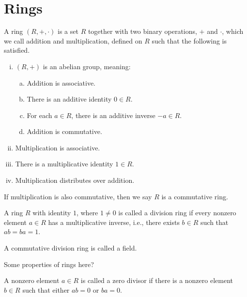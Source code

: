 \section{Rings}

\begin{defn}
  A ring $(R, +, \cdot)$ is a set $R$ together with two binary operations, $+$
  and $\cdot$, which we call addition and multiplication, defined on $R$ such
  that the following is satisfied.
  
  \begin{enumerate}[(i)]
    \item $(R,+)$ is an abelian group, meaning:
    \begin{enumerate}[(a)]
      \item Addition is associative.
      \item There is an additive identity $0 \in R$.
      \item For each $a \in R$, there is an additive inverse $-a \in R$.
      \item Addition is commutative.
    \end{enumerate}
    
    \item Multiplication is associative. 
    \item There is a multiplicative identity $1 \in R$.
    \item Multiplication distributes over addition.
  \end{enumerate}
  
  If multiplication is also commutative, then we say $R$ is a commutative ring.
\end{defn}


\begin{defn}
  A ring $R$ with identity $1$, where $1 \neq 0$ is called a division ring
  if every nonzero element $a \in R$ has a multiplicative inverse, i.e., there
  exists $b \in R$ such that $ab=ba=1$.
  
  A commutative division ring is called a field. 
\end{defn}


\begin{prop}
  Some properties of rings here?
\end{prop}


\begin{defn}
  A nonzero element $a \in R$ is called a zero divisor if there is a nonzero
  element $b \in R$ such that either $ab=0$ or $ba=0$.
\end{defn}


